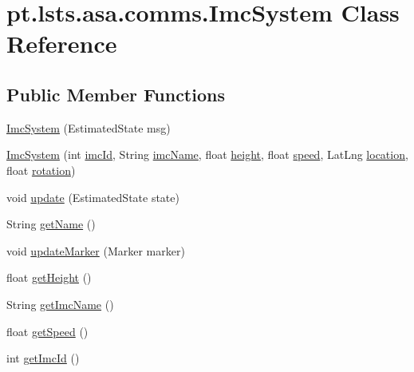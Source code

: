 \hypertarget{classpt_1_1lsts_1_1asa_1_1comms_1_1ImcSystem}{}\section{pt.\+lsts.\+asa.\+comms.\+Imc\+System Class Reference}
\label{classpt_1_1lsts_1_1asa_1_1comms_1_1ImcSystem}
\subsection*{Public Member Functions}
\begin{DoxyCompactItemize}
\item 
\hyperlink{classpt_1_1lsts_1_1asa_1_1comms_1_1ImcSystem_ae85090f9cfbda5d421fa44685582876c}{Imc\+System} (Estimated\+State msg)
\item 
\hyperlink{classpt_1_1lsts_1_1asa_1_1comms_1_1ImcSystem_a94154e843be9add21e8cd062babe7658}{Imc\+System} (int \hyperlink{classpt_1_1lsts_1_1asa_1_1comms_1_1ImcSystem_ac42b6810c36514facda51cc0cf42d343}{imc\+Id}, String \hyperlink{classpt_1_1lsts_1_1asa_1_1comms_1_1ImcSystem_a035749ded821f7a8095f7174b74c904e}{imc\+Name}, float \hyperlink{classpt_1_1lsts_1_1asa_1_1comms_1_1ImcSystem_afcbb198ac569fb1ae5de4a1809bed10c}{height}, float \hyperlink{classpt_1_1lsts_1_1asa_1_1comms_1_1ImcSystem_a425d911ad6689aef73a9103ca5621db6}{speed}, Lat\+Lng \hyperlink{classpt_1_1lsts_1_1asa_1_1comms_1_1ImcSystem_ae9e9619bacd8538ef96630499c51e762}{location}, float \hyperlink{classpt_1_1lsts_1_1asa_1_1comms_1_1ImcSystem_a30a763c50ea85e886d882aba0efd9025}{rotation})
\item 
void \hyperlink{classpt_1_1lsts_1_1asa_1_1comms_1_1ImcSystem_a003b27093c404d8e73dd38511eb0a2d1}{update} (Estimated\+State state)
\item 
String \hyperlink{classpt_1_1lsts_1_1asa_1_1comms_1_1ImcSystem_ab71a38250aeb83e8c241ccb0c688735f}{get\+Name} ()
\item 
void \hyperlink{classpt_1_1lsts_1_1asa_1_1comms_1_1ImcSystem_ac13e7c24c471bc4de1c76a50e583141e}{update\+Marker} (Marker marker)
\item 
float \hyperlink{classpt_1_1lsts_1_1asa_1_1comms_1_1ImcSystem_aed8edb9a4ead53a5ef5654b93776060f}{get\+Height} ()
\item 
String \hyperlink{classpt_1_1lsts_1_1asa_1_1comms_1_1ImcSystem_a3c41296d6f58ea7398f9e9b200667d9b}{get\+Imc\+Name} ()
\item 
float \hyperlink{classpt_1_1lsts_1_1asa_1_1comms_1_1ImcSystem_ae0870e405a15713a6629f4ba7436cda8}{get\+Speed} ()
\item 
int \hyperlink{classpt_1_1lsts_1_1asa_1_1comms_1_1ImcSystem_ade2d2c53aa4d92bb8827a7ece13df369}{get\+Imc\+Id} ()
\end{DoxyCompactItemize}

